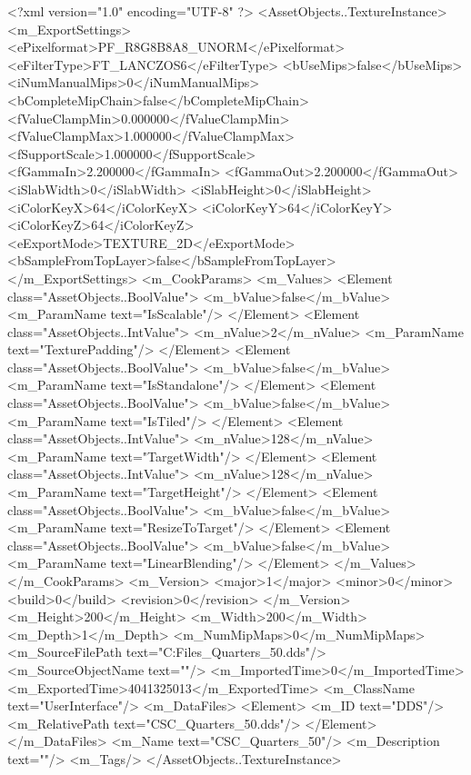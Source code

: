 <?xml version="1.0" encoding="UTF-8" ?>
<AssetObjects..TextureInstance>
	<m_ExportSettings>
		<ePixelformat>PF_R8G8B8A8_UNORM</ePixelformat>
		<eFilterType>FT_LANCZOS6</eFilterType>
		<bUseMips>false</bUseMips>
		<iNumManualMips>0</iNumManualMips>
		<bCompleteMipChain>false</bCompleteMipChain>
		<fValueClampMin>0.000000</fValueClampMin>
		<fValueClampMax>1.000000</fValueClampMax>
		<fSupportScale>1.000000</fSupportScale>
		<fGammaIn>2.200000</fGammaIn>
		<fGammaOut>2.200000</fGammaOut>
		<iSlabWidth>0</iSlabWidth>
		<iSlabHeight>0</iSlabHeight>
		<iColorKeyX>64</iColorKeyX>
		<iColorKeyY>64</iColorKeyY>
		<iColorKeyZ>64</iColorKeyZ>
		<eExportMode>TEXTURE_2D</eExportMode>
		<bSampleFromTopLayer>false</bSampleFromTopLayer>
	</m_ExportSettings>
	<m_CookParams>
		<m_Values>
			<Element class="AssetObjects..BoolValue">
				<m_bValue>false</m_bValue>
				<m_ParamName text="IsScalable"/>
			</Element>
			<Element class="AssetObjects..IntValue">
				<m_nValue>2</m_nValue>
				<m_ParamName text="TexturePadding"/>
			</Element>
			<Element class="AssetObjects..BoolValue">
				<m_bValue>false</m_bValue>
				<m_ParamName text="IsStandalone"/>
			</Element>
			<Element class="AssetObjects..BoolValue">
				<m_bValue>false</m_bValue>
				<m_ParamName text="IsTiled"/>
			</Element>
			<Element class="AssetObjects..IntValue">
				<m_nValue>128</m_nValue>
				<m_ParamName text="TargetWidth"/>
			</Element>
			<Element class="AssetObjects..IntValue">
				<m_nValue>128</m_nValue>
				<m_ParamName text="TargetHeight"/>
			</Element>
			<Element class="AssetObjects..BoolValue">
				<m_bValue>false</m_bValue>
				<m_ParamName text="ResizeToTarget"/>
			</Element>
			<Element class="AssetObjects..BoolValue">
				<m_bValue>false</m_bValue>
				<m_ParamName text="LinearBlending"/>
			</Element>
		</m_Values>
	</m_CookParams>
	<m_Version>
		<major>1</major>
		<minor>0</minor>
		<build>0</build>
		<revision>0</revision>
	</m_Version>
	<m_Height>200</m_Height>
	<m_Width>200</m_Width>
	<m_Depth>1</m_Depth>
	<m_NumMipMaps>0</m_NumMipMaps>
	<m_SourceFilePath text="C:\Users\Shadow\Desktop\Working Files\Icons\Quarters\CSC_Quarters_50.dds"/>
	<m_SourceObjectName text=""/>
	<m_ImportedTime>0</m_ImportedTime>
	<m_ExportedTime>4041325013</m_ExportedTime>
	<m_ClassName text="UserInterface"/>
	<m_DataFiles>
		<Element>
			<m_ID text="DDS"/>
			<m_RelativePath text="CSC_Quarters_50.dds"/>
		</Element>
	</m_DataFiles>
	<m_Name text="CSC_Quarters_50"/>
	<m_Description text=""/>
	<m_Tags/>
</AssetObjects..TextureInstance>

